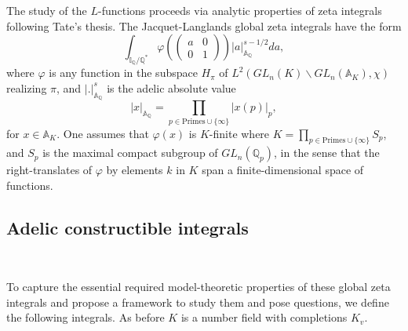 \documentclass[12pt]{amsart}
\def\A{\mathbb{A}}
\def\I{\mathbb{I}}
\def\Q{\mathbb{Q}}
\numberwithin{equation}{section}
\begin{document}
The study of the $L$-functions proceeds via analytic properties of zeta integrals following Tate's thesis.  
The Jacquet-Langlands global zeta integrals have the form
$$\int_{\I_{\Q}/\Q^*} \varphi(\begin{pmatrix} a & 0\\ 0 & 1\end{pmatrix})|a|^{s-1/2}_{\A_{\Q}} da,$$
where $\varphi$ is any function in the subspace $H_{\pi}$ of $L^2(GL_n(K)\backslash GL_n(\A_K),\chi)$ realizing $\pi$, and $|.|_{\A_{\Q}}^s$ is the adelic absolute value 
$$|x|_{\A_{\Q}}=\prod_{p\in \text{Primes}\cup \{\infty\}} |x(p)|_p,$$
for $x\in \A_K$. One assumes that $\varphi(x)$ is $K$-finite where $K=\prod_{p\in \text{Primes}\cup \{\infty\}} S_p$, and $S_p$ is the maximal compact subgroup of $GL_n(\Q_p)$, in the sense that the right-translates 
of $\varphi$ by elements $k$ in $K$ span a finite-dimensional space of functions. 





\medskip

\subsection{\bf Adelic constructible integrals}\label{ssec-cons}

\

\medskip

To capture the essential required model-theoretic properties of these global zeta integrals and propose a framework to study them and pose questions, we define the following integrals. As before 
$K$ is a number field with completions $K_v$. 
\end{document}
